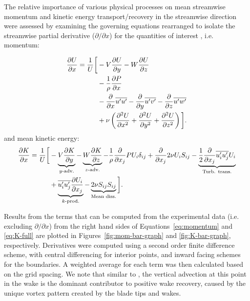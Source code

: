 \documentclass[energies,article,accept,moreauthors,pdftex,12pt,a4paper]{mdpi}
\def \p{\partial}
\begin{document}
The relative importance of various physical processes on mean streamwise
momentum and kinetic energy transport/recovery in the streamwise direction were
assessed by examining the governing equations rearranged to isolate the
streamwise partial derivative ($\partial / \partial x$) for the quantities of
interest \cite{Bachant2015-JoT}, i.e. momentum:

\begin{equation}
	\begin{split}
		\frac{\p U}{\p x}  =  
		\frac{1}{U} \bigg{[}
		& - V\frac{\p U}{\p y}
		- W\frac{\p U}{\p z} \\
		& -\frac{1}{\rho}\frac{\p P}{\p x} \\
		& - \frac{\p}{\p x} \overline{u'u'}
		- \frac{\p}{\p y} \overline{u'v'}
		- \frac{\p}{\p z} \overline{u'w'} \\
		& + \nu\left(\frac{\p^2 U}{\p x^2}
		+ \frac{\p^2 U}{\p y^2}
		+ \frac{\p^2 U}{\p z^2} \right)
		\bigg{]}.
	\end{split}
	\label{eq:momentum}
\end{equation}
and mean kinetic energy:
\begin{equation}
	\begin{split}
		\frac{\p K}{\p x}
		=
		\frac{1}{U}
		\bigg{[}
		& - \underbrace{V \frac{\p K}{\p y}}_{y\text{-adv.}}
		- \underbrace{W \frac{\p K}{\p z}}_{z\text{-adv.}}
		- \frac{1}{\rho}\frac{\p}{\p x_j} P U_i \delta_{ij}
		+ \frac{\p}{\p x_j} 2 \nu U_i S_{ij} %
		- \underbrace{
		\frac{1}{2}\frac{\p}{\p x_j} \overline{u_i' u_j'} U_i
		}_{\text{Turb. trans.}} \\
		& + 
		\underbrace{
		\overline{u_i' u_j'} \frac{\p U_i}{\p x_j}
		}_{k\text{-prod.}}
		- 
		\underbrace{
		2 \nu S_{ij}S_{ij}
		}_{\text{Mean diss.}}
		\bigg{]}.
	\label{eq:K-full}
	\end{split}
\end{equation}

Results from the terms that can be computed from the experimental data (i.e.
excluding $\partial / \partial x$) from the right hand sides of
Equations~\ref{eq:momentum} and \ref{eq:K-full} are plotted in
Figures~\ref{fig:mom-bar-graph} and \ref{fig:K-bar-graph}, respectively.
Derivatives were computed using a second order finite difference scheme, with
central differencing for interior points, and inward facing schemes for the
boundaries. A weighted average for each term was then calculated based on the
grid spacing. We note that similar to \cite{Bachant2015-JoT}, the vertical
advection at this point in the wake is the dominant contributor to positive wake
recovery, caused by the unique vortex pattern created by the blade tips and
wakes.
\end{document}
